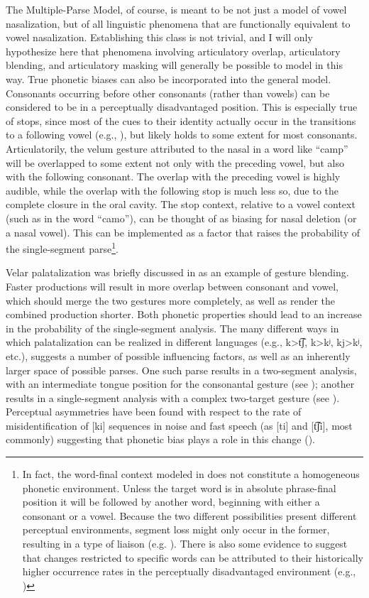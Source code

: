 The Multiple-Parse Model, of course, is meant to be not just a model
of vowel nasalization, but of all linguistic phenomena that are functionally
equivalent to vowel nasalization. Establishing this class is not trivial,
and I will only hypothesize here that phenomena involving articulatory
overlap, articulatory blending, and articulatory masking will generally
be possible to model in this way. True phonetic biases can also be
incorporated into the general model. Consonants occurring before other
consonants (rather than vowels) can be considered to be in a perceptually
disadvantaged position. This is especially true of stops, since most
of the cues to their identity actually occur in the transitions to
a following vowel (e.g., \citealt{liberman1954role}), but likely
holds to some extent for most consonants. Articulatorily, the velum
gesture attributed to the nasal in a word like “camp” will be
overlapped to some extent not only with the preceding vowel, but also
with the following consonant. The overlap with the preceding vowel
is highly audible, while the overlap with the following stop is much
less so, due to the complete closure in the oral cavity. The stop
context, relative to a vowel context (such as in the word “camo”),
can be thought of as biasing for nasal deletion (or a nasal vowel).
This can be implemented as a factor that raises the probability of
the single-segment parse\footnote{In fact, the word-final context modeled in 
does not constitute a homogeneous phonetic environment. Unless the
target word is in absolute phrase-final position it will be followed
by another word, beginning with either a consonant or a vowel. Because
the two different possibilities present different perceptual environments,
segment loss might only occur in the former, resulting in a type of
liaison (e.g. \citealt{Tranel1981}). There is also some evidence
to suggest that changes restricted to specific words can be attributed
to their historically higher occurrence rates in the perceptually
disadvantaged environment (e.g., \citealt{brown2012discourse})}.

Velar palatalization was briefly discussed in 
as an example of gesture blending. Faster productions will result
in more overlap between consonant and vowel, which should merge the
two gestures more completely, as well as render the combined production
shorter. Both phonetic properties should lead to an increase in the
probability of the single-segment analysis. The many different ways
in which palatalization can be realized in different languages (e.g.,
{k\textgreater t͡ʃ}, {k\textgreater kʲ}, {kj\textgreater kʲ},
etc.), suggests a number of possible influencing factors, as well
as an inherently larger space of possible parses. One such parse results
in a two-segment analysis, with an intermediate tongue position for
the consonantal gesture (see ); another
results in a single-segment analysis with a complex two-target gesture
(see ). Perceptual asymmetries have
been found with respect to the rate of misidentification of {[}ki{]}
sequences in noise and fast speech (as {[}ti{]} and {[t͡ʃi]},
most commonly) suggesting that phonetic bias plays a role in this
change (\citealt{Guion1998,Chang2001}).

